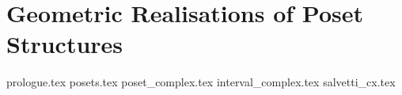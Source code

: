 \documentclass[class=article, crop=false]{standalone}
\begin{document}
\chapter{Geometric Realisations of Poset Structures}
{prologue.tex}
{posets.tex}
{poset_complex.tex}
{interval_complex.tex}
{salvetti_cx.tex}
\end{document}

